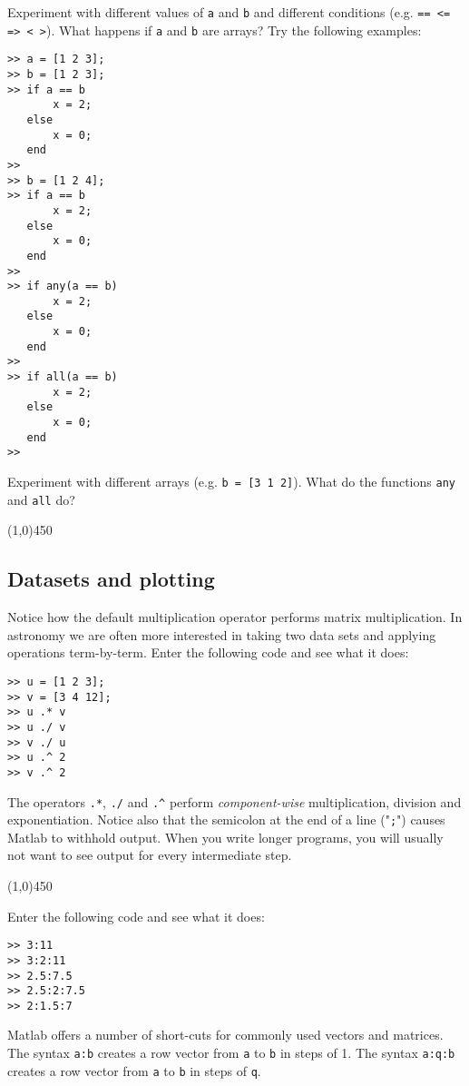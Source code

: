 \documentclass[12pt,a4paper]{article}   %
\newcommand{\code}[1]{\texttt{#1}}
\newcommand{\ruler}{
  \begin{center}
    \line(1,0){450}
  \end{center}
}
\begin{document}
Experiment with different values of \code{a} and \code{b} and different conditions
(e.g. \code{==  <=  =>  <  >}). What happens if \code{a} and \code{b} are arrays?
Try the following examples:


\begin{verbatim}
>> a = [1 2 3];
>> b = [1 2 3];
>> if a == b
       x = 2;
   else
       x = 0;
   end
>>
>> b = [1 2 4];
>> if a == b
       x = 2;
   else
       x = 0;
   end
>>
>> if any(a == b)
       x = 2;
   else
       x = 0;
   end
>>
>> if all(a == b)
       x = 2;
   else
       x = 0;
   end
>>
\end{verbatim}

Experiment with different arrays (e.g. \code{b = [3 1 2]}). What do the functions
\code{any} and \code{all} do?


\ruler

\subsection{Datasets and plotting}

Notice how the default multiplication operator performs matrix multiplication. In astronomy
we are often more interested in taking two data sets and applying operations term-by-term.
Enter the following code and see what it does:


\begin{verbatim}
>> u = [1 2 3];
>> v = [3 4 12];
>> u .* v
>> u ./ v
>> v ./ u
>> u .^ 2
>> v .^ 2
\end{verbatim}

The operators \code{.*}, \code{./} and \code{.\^} perform \textit{component-wise}
multiplication, division and exponentiation. Notice also that the semicolon at the
end of a line ("\code{;}") causes Matlab to withhold output. When you write longer
programs, you will usually not want to see output for every intermediate step.


\ruler

Enter the following code and see what it does:

\begin{verbatim}
>> 3:11
>> 3:2:11
>> 2.5:7.5
>> 2.5:2:7.5
>> 2:1.5:7
\end{verbatim}


Matlab offers a number of short-cuts for commonly used vectors and matrices. The syntax
\code{a:b} creates a row vector from \code{a} to \code{b} in steps of 1. The syntax
\code{a:q:b} creates a row vector from \code{a} to \code{b} in steps of \code{q}.
\end{document}
